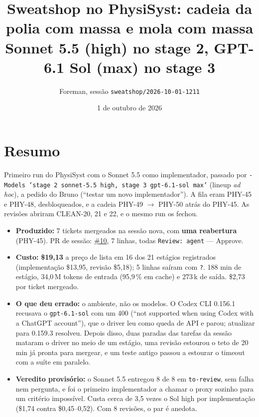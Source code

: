 \documentclass[11pt,a4paper]{article}
\title{Sweatshop no PhysiSyst: cadeia da polia com massa e mola com massa\\\large Sonnet 5.5 (high) no stage 2, GPT-6.1 Sol (max) no stage 3}
\author{Foreman, sessão \texttt{sweatshop/2026-10-01-1211}}
\date{1 de outubro de 2026}
\begin{document}
\maketitle

\section*{Resumo}

Primeiro run do PhysiSyst com o Sonnet 5.5 como implementador, passado por
\texttt{-Models 'stage 2 sonnet-5.5 high, stage 3 gpt-6.1-sol max'}
(lineup \emph{ad hoc}), a pedido do Bruno (``testar um novo implementador'').
A fila eram PHY-45 e PHY-48, desbloqueados, e a cadeia PHY-49
$\rightarrow$ PHY-50 atrás do PHY-45. As revisões abriram CLEAN-20, 21 e 22, e
o mesmo run os fechou.

\begin{itemize}
  \item \textbf{Produzido:} 7 tickets mergeados na sessão nova, com \textbf{uma
        reabertura} (PHY-45). PR de sessão:
        \href{https://github.com/Laginho/PhysiSyst/pull/10}{\#10}, 7 linhas,
        todas \texttt{Review: agent} --- Approve.
  \item \textbf{Custo:} \textbf{\$19,13} a preço de lista em 16 dos 21
        estágios registrados (implementação \$13,95, revisão \$5,18); 5 linhas
        saíram com \texttt{?}. 188 min de estágio, 34,0\,M tokens de entrada
        (95,9\,\% em cache) e 273\,k de saída. \$2,73 por ticket mergeado.
  \item \textbf{O que deu errado:} o ambiente, não os modelos. O Codex CLI
        0.156.1 recusava o \texttt{gpt-6.1-sol} com um 400 (``not supported
        when using Codex with a ChatGPT account''), que o driver leu como queda
        de API e parou; atualizar para 0.159.3 resolveu. Depois disso, duas
        paradas das tarefas da sessão mataram o driver no meio de um estágio,
        uma revisão estourou o teto de 20 min já pronta para mergear, e um
        teste antigo passou a estourar o timeout com a suíte em paralelo.
  \item \textbf{Veredito provisório:} o Sonnet 5.5 entregou 8 de 8 em
        \texttt{to-review}, sem falha nem pergunta, e foi o primeiro
        implementador a chamar o proxy sozinho para um critério impossível.
        Custa cerca de 3,5 vezes o Sol high por implementação (\$1,74 contra
        \$0,45--0,52). Com 8 revisões, o par é anedota.
\end{itemize}
\end{document}
